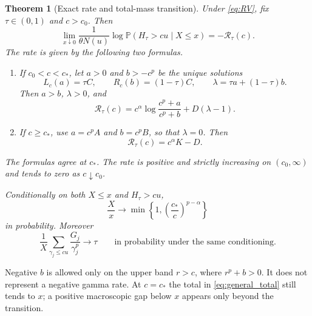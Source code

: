 \documentclass[11pt,letterpaper]{article}
\numberwithin{equation}{section}
\newtheorem{theorem}{Theorem}[section]
\theoremstyle{definition}
\theoremstyle{remark}
\newcommand{\PP}{\mathbb P}
\newcommand{\rate}{\mathcal R_\tau}
\begin{document}
\begin{theorem}[Exact rate and total-mass transition]\label{thm:main}
Under \cref{eq:RV}, fix $\tau\in(0,1)$ and $c>c_0$. Then
\begin{equation}\label{eq:rate_limit}
 \lim_{x\downarrow0}\frac1{\theta N(u)}
 \log\PP(H_\tau>cu\mid X\le x)=-\rate(c).
\end{equation}
The rate is given by the following two formulas.
\begin{enumerate}[label=\textup{(\roman*)}]
\item If $c_0<c<c_*$, let $a>0$ and $b>-c^p$ be the unique solutions
\begin{equation}\label{eq:boundary_rates}
 L_c(a)=\tau C,\qquad R_c(b)=(1-\tau)C,
 \qquad \lambda=\tau a+(1-\tau)b.
\end{equation}
Then $a>b$, $\lambda>0$, and
\begin{equation}\label{eq:boundary_rate}
 \boxed{\rate(c)=c^\alpha\log\frac{c^p+a}{c^p+b}+D(\lambda-1).}
\end{equation}
\item If $c\ge c_*$, use $a=c^pA$ and $b=c^pB$, so that $\lambda=0$. Then
\begin{equation}\label{eq:interior_rate}
 \boxed{\rate(c)=c^\alpha K-D.}
\end{equation}
\end{enumerate}
The formulas agree at $c_*$. The rate is positive and strictly increasing on $(c_0,\infty)$ and tends to zero as $c\downarrow c_0$.

Conditionally on both $X\le x$ and $H_\tau>cu$,
\begin{equation}\label{eq:general_total}
 \boxed{\frac Xx\longrightarrow
 \min\left\{1,\left(\frac{c_*}{c}\right)^{p-\alpha}\right\}}
\end{equation}
in probability. Moreover
\begin{equation}\label{eq:fraction_limit}
 \frac1X\sum_{\gamma_j\le cu}\frac{G_j}{\gamma_j^p}\longrightarrow\tau
 \qquad\text{in probability under the same conditioning.}
\end{equation}
\end{theorem}

Negative $b$ is allowed only on the upper band $r>c$, where $r^p+b>0$. It does not represent a negative gamma rate. At $c=c_*$ the total in \cref{eq:general_total} still tends to $x$; a positive macroscopic gap below $x$ appears only beyond the transition.
\end{document}
